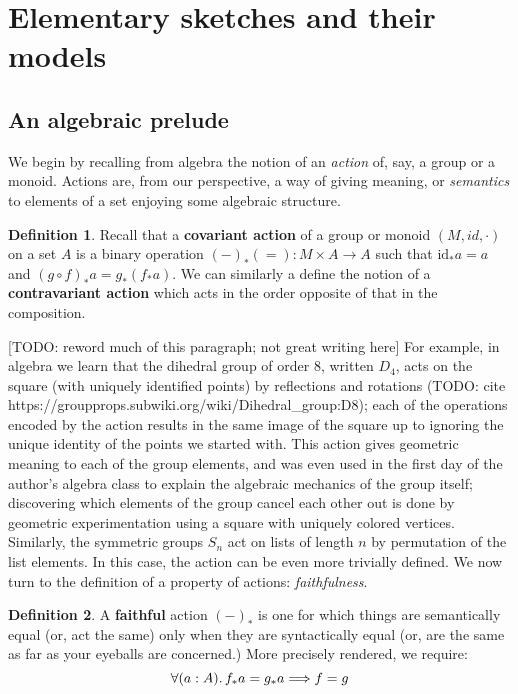 \documentclass[12pt,twoside]{reedthesis}
\theoremstyle{definition}
\newtheorem{definition}{Definition}
\theoremstyle{remark}
\theoremstyle{plain}
\begin{document}
\section{Elementary sketches and their models}
\subsection{An algebraic prelude}
We begin by recalling from algebra the notion of an \emph{action} of, say, a
group or a monoid. Actions are, from our perspective, a way of giving meaning,
or \emph{semantics} to elements of a set enjoying some algebraic structure.
\begin{definition}\label{def:covariant action}
  Recall that a \textbf{covariant action} of a group or monoid \((M, id, \cdot)\) on a
  set \(A\) is a binary operation \((-)_* (=) : M ‌\times A \rightarrow A\) such that
  \(\text{id}_* a = a\) and \( (g \circ f)_* a = g_* (f_* a) \). We can similarly a
  define the notion of a \textbf{contravariant action} which acts in the order
  opposite of that in the composition.
\end{definition}
[TODO: reword much of this paragraph; not great writing here]
For example, in algebra we learn that the dihedral group of order 8, written
$D_{4}$, acts on the square (with uniquely identified points) by reflections and
rotations (TODO: cite https://groupprops.subwiki.org/wiki/Dihedral\_group:D8);
each of the operations encoded by the action results in the same image of the
square up to ignoring the unique identity of the points we started with. This
action gives geometric meaning to each of the group elements, and was even used
in the first day of the author's algebra class to explain the algebraic
mechanics of the group itself; discovering which elements of the group cancel
each other out is done by geometric experimentation using a square with uniquely
colored vertices. Similarly, the symmetric groups $S_{n}$ act on lists of length
$n$ by permutation of the list elements. In this case, the action can be even
more trivially defined. We now turn to the definition of a property of actions:
\emph{faithfulness}.

\begin{definition}\label{def:faithful}
  A \textbf{faithful} action $(-)_{*}$ is one for which things
  are semantically equal (or, act the same) only when they are syntactically
  equal (or, are the same as far as your eyeballs are concerned.) More precisely
  rendered, we require: \[ \forall (a:A)\ldotp f_* a = g_* a \Longrightarrow f = g \]
\end{definition}
\end{document}
